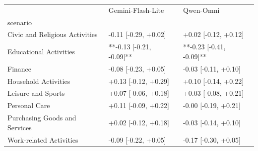 \begin{tabular}{lll}
\toprule
 & Gemini-Flash-Lite & Qwen-Omni \\
scenario &  &  \\
\midrule
Civic and Religious Activities & -0.11 [-0.29, +0.02] & +0.02 [-0.12, +0.12] \\
Educational Activities & **-0.13 [-0.21, -0.09]** & **-0.23 [-0.41, -0.09]** \\
Finance & -0.08 [-0.23, +0.05] & -0.03 [-0.11, +0.10] \\
Household Activities & +0.13 [-0.12, +0.29] & +0.10 [-0.14, +0.22] \\
Leisure and Sports & +0.07 [-0.06, +0.18] & +0.03 [-0.08, +0.21] \\
Personal Care & +0.11 [-0.09, +0.22] & -0.00 [-0.19, +0.21] \\
Purchasing Goods and Services & +0.02 [-0.12, +0.18] & -0.03 [-0.14, +0.10] \\
Work-related Activities & -0.09 [-0.22, +0.05] & -0.17 [-0.30, +0.05] \\
\bottomrule
\end{tabular}

